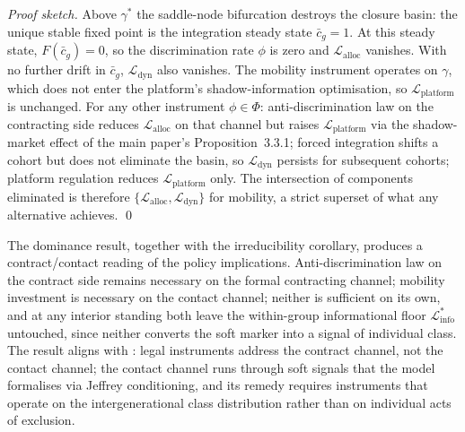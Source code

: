 \documentclass[12pt,a4paper]{article}
\theoremstyle{definition}
\numberwithin{proposition}{section}
\begin{document}
\begin{proof}[Proof sketch]
Above $\gamma^*$ the saddle-node bifurcation destroys the closure
basin: the unique stable fixed point is the integration steady
state $\bar{c}_g = 1$. At this steady state, $F(\bar{c}_g) = 0$,
so the discrimination rate $\phi$ is zero and
$\mathcal{L}_{\text{alloc}}$ vanishes. With no further drift in
$\bar{c}_g$, $\mathcal{L}_{\text{dyn}}$ also vanishes. The
mobility instrument operates on $\gamma$, which does not enter the
platform's shadow-information optimisation, so
$\mathcal{L}_{\text{platform}}$ is unchanged. For any other
instrument $\phi \in \Phi$:
anti-discrimination law on the contracting side reduces
$\mathcal{L}_{\text{alloc}}$ on that channel but raises
$\mathcal{L}_{\text{platform}}$ via the shadow-market effect of
the main paper's Proposition~3.3.1; forced integration shifts a
cohort but does not eliminate the basin, so
$\mathcal{L}_{\text{dyn}}$ persists for subsequent cohorts;
platform regulation reduces $\mathcal{L}_{\text{platform}}$ only.
The intersection of components eliminated is therefore
$\{\mathcal{L}_{\text{alloc}}, \mathcal{L}_{\text{dyn}}\}$ for
mobility, a strict superset of what any alternative achieves.
\qed
\end{proof}

The dominance result, together with the irreducibility corollary,
produces a contract/contact reading of the policy implications.
Anti-discrimination law on the contract side
remains necessary on the formal contracting channel; mobility
investment is necessary on the contact channel; neither is
sufficient on its own, and at any interior standing both leave the
within-group informational floor $\mathcal{L}_{\text{info}}^*$
untouched, since neither converts the soft marker into a signal of
individual class. The result aligns with
\citet{Loury2002}: legal instruments address the contract channel,
not the contact channel; the contact channel runs through soft
signals that the model formalises via Jeffrey conditioning, and
its remedy requires instruments that operate on the
intergenerational class distribution rather than on individual
acts of exclusion.



\end{document}

